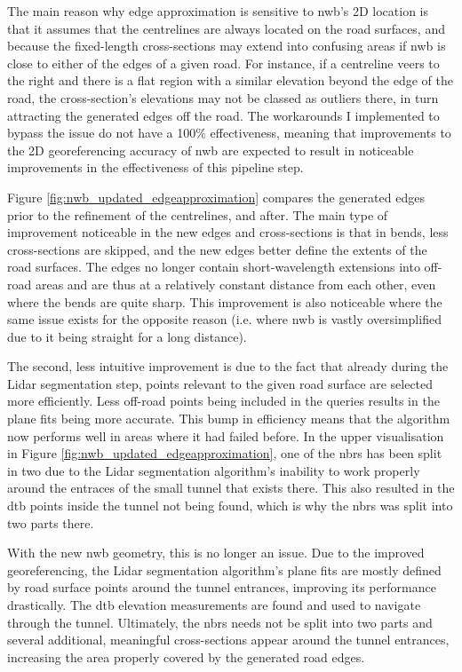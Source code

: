 The main reason why edge approximation is sensitive to \ac{nwb}'s 2D location is that it assumes that the centrelines are always located on the road surfaces, and because the fixed-length cross-sections may extend into confusing areas if \ac{nwb} is close to either of the edges of a given road. For instance, if a centreline veers to the right and there is a flat region with a similar elevation beyond the edge of the road, the cross-section's elevations may not be classed as outliers there, in turn attracting the generated edges off the road. The workarounds I implemented to bypass the issue do not have a 100\% effectiveness, meaning that improvements to the 2D georeferencing accuracy of \ac{nwb} are expected to result in noticeable improvements in the effectiveness of this pipeline step.

Figure \ref{fig:nwb_updated_edgeapproximation} compares the generated edges prior to the refinement of the centrelines, and after. The main type of improvement noticeable in the new edges and cross-sections is that in bends, less cross-sections are skipped, and the new edges better define the extents of the road surfaces. The edges no longer contain short-wavelength extensions into off-road areas and are thus at a relatively constant distance from each other, even where the bends are quite sharp. This improvement is also noticeable where the same issue exists for the opposite reason (i.e. where \ac{nwb} is vastly oversimplified due to it being straight for a long distance).

The second, less intuitive improvement is due to the fact that already during the Lidar segmentation step, points relevant to the given road surface are selected more efficiently. Less off-road points being included in the queries results in the plane fits being more accurate. This bump in efficiency means that the algorithm now performs well in areas where it had failed before. In the upper visualisation in Figure \ref{fig:nwb_updated_edgeapproximation}, one of the \ac{nbrs} has been split in two due to the Lidar segmentation algorithm's inability to work properly around the entraces of the small tunnel that exists there. This also resulted in the \ac{dtb} points inside the tunnel not being found, which is why the \ac{nbrs} was split into two parts there.

With the new \ac{nwb} geometry, this is no longer an issue. Due to the improved georeferencing, the Lidar segmentation algorithm's plane fits are mostly defined by road surface points around the tunnel entrances, improving its performance drastically. The \ac{dtb} elevation measurements are found and used to navigate through the tunnel. Ultimately, the \ac{nbrs} needs not be split into two parts and several additional, meaningful cross-sections appear around the tunnel entrances, increasing the area properly covered by the generated road edges.

